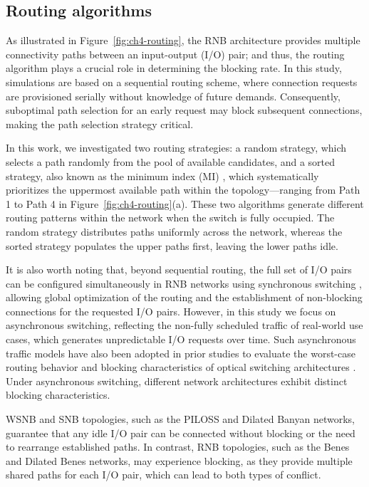 \subsection{Routing algorithms} \label{sub:routing_algorithms} %
As illustrated in Figure~\ref{fig:ch4-routing}, the RNB architecture provides multiple connectivity paths between an input-output (I/O) pair; and thus, the routing algorithm plays a crucial role in determining the blocking rate.
In this study, simulations are based on a sequential routing scheme, where connection requests are provisioned serially without knowledge of future demands.
Consequently, suboptimal path selection for an early request may block subsequent connections, making the path selection strategy critical.

In this work, we investigated two routing strategies: a random strategy, which selects a path randomly from the pool of available candidates, and a sorted strategy, also known as the minimum index (MI) \cite{changWidesenseNonblockingMulti2006, guoWidesenseNonblockingNew2013}, which systematically prioritizes the uppermost available path within the topology—ranging from Path 1 to Path 4 in Figure~\ref{fig:ch4-routing}(a).
These two algorithms generate different routing patterns within the network when the switch is fully occupied.
The random strategy distributes paths uniformly across the network, whereas the sorted strategy populates the upper paths first, leaving the lower paths idle.

It is also worth noting that, beyond sequential routing, the full set of I/O pairs can be configured simultaneously in RNB networks using synchronous switching \cite{chakrabartyMatrixBasedNonblockingRouting2009, karimiIntroductionAnalysisOptimal2014, zulfinImplementationRoutingDivision2020}, allowing global optimization of the routing and the establishment of non-blocking connections for the requested I/O pairs.
However, in this study we focus on asynchronous switching, reflecting the non-fully scheduled traffic of real-world use cases, which generates unpredictable I/O requests over time.
Such asynchronous traffic models have also been adopted in prior studies to evaluate the worst-case routing behavior and blocking characteristics of optical switching architectures \cite{8535157}.
Under asynchronous switching, different network architectures exhibit distinct blocking characteristics.

WSNB and SNB topologies, such as the PILOSS and Dilated Banyan networks, guarantee that any idle I/O pair can be connected without blocking or the need to rearrange established paths.
In contrast, RNB topologies, such as the Benes and Dilated Benes networks, may experience blocking, as they provide multiple shared paths for each I/O pair, which can lead to both types of conflict.
